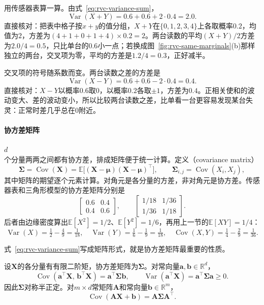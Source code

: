 用传感器表算一算。由式~\eqref{eq:rvc-variance-sum}，
\[
 \operatorname{Var}(X+Y)=0.6+0.6+2\cdot0.4=2.0 .
\]
直接核对：把表中格子按$x+y$的值分组，$X+Y$在$\{0,1,2,3,4\}$上各取概率$0.2$，均值为$2$，方差为$(4+1+0+1+4)\times0.2=2$。两台读数的平均$(X+Y)/2$方差为$2.0/4=0.5$，只比单台的$0.6$小一点；若换成图~\ref{fig:rvc-same-marginals}(b)那样独立的两台，交叉项为零，平均的方差是$1.2/4=0.3$，正好减半。

交叉项的符号随系数而变。两台读数之差的方差是
\[
 \operatorname{Var}(X-Y)=0.6+0.6-2\cdot0.4=0.4 .
\]
直接核对：$X-Y$以概率$0.6$取$0$，以概率$0.2$各取$\pm1$，方差为$0.4$。正相关使和的波动变大、差的波动变小，所以比较两台读数之差，比单看一台更容易发现某台失灵：正常时差几乎总在$0$附近。

\paragraph{协方差矩阵}
$d$个分量两两之间都有协方差，排成矩阵便于统一计算。定义（covariance matrix）
\begin{equation}
 \bm{\Sigma}=\operatorname{Cov}(\bm{X})=\mathbb{E}\bigl[(\bm{X}-\bm{\mu})(\bm{X}-\bm{\mu})^{\top}\bigr],\qquad
 \bm{\Sigma}_{i,j}=\operatorname{Cov}(X_i,X_j),
 \label{eq:rvc-covariance-matrix}
\end{equation}
其中矩阵的期望逐个元素计算。对角元是各分量的方差，非对角元是协方差。传感器表和三角形模型的协方差矩阵分别是
\[
 \begin{bmatrix}0.6&0.4\\0.4&0.6\end{bmatrix},\qquad
 \begin{bmatrix}1/18&1/36\\1/36&1/18\end{bmatrix}.
\]
后者由边缘密度算出$\mathbb{E}[X^{2}]=1/2$、$\mathbb{E}[Y^{2}]=1/6$，再用上一节的$\mathbb{E}[XY]=1/4$：
\[
 \operatorname{Var}(X)=\tfrac12-\tfrac49=\tfrac1{18},\quad
 \operatorname{Var}(Y)=\tfrac16-\tfrac19=\tfrac1{18},\quad
 \operatorname{Cov}(X,Y)=\tfrac14-\tfrac29=\tfrac1{36}.
\]

式~\eqref{eq:rvc-variance-sum}写成矩阵形式，就是协方差矩阵最重要的性质。

\begin{theorem}[协方差矩阵的性质]
\label{thm:rvc-covariance-matrix}
设$\bm{X}$的各分量有有限二阶矩，协方差矩阵为$\bm{\Sigma}$。对常向量$\bm{a},\bm{b}\in\mathbb{R}^{d}$，
\begin{equation}
 \operatorname{Cov}(\bm{a}^{\top}\bm{X},\,\bm{b}^{\top}\bm{X})=\bm{a}^{\top}\bm{\Sigma}\bm{b},\qquad
 \operatorname{Var}(\bm{a}^{\top}\bm{X})=\bm{a}^{\top}\bm{\Sigma}\bm{a}\geq 0 .
 \label{eq:rvc-quadratic-form}
\end{equation}
因此$\bm{\Sigma}$对称半正定。对$m\times d$常矩阵$\bm{A}$和常向量$\bm{b}\in\mathbb{R}^{m}$，
\begin{equation}
 \operatorname{Cov}(\bm{A}\bm{X}+\bm{b})=\bm{A}\bm{\Sigma}\bm{A}^{\top}.
 \label{eq:rvc-covariance-affine}
\end{equation}
\end{theorem}

